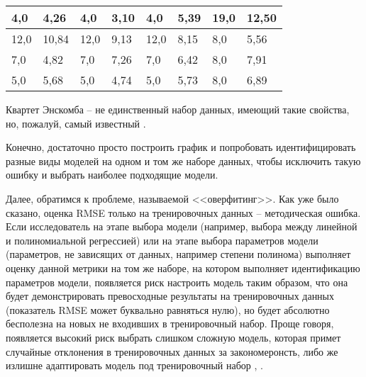 \begin{table}[!htp]
\begin{tabular}{|ll|ll|ll|ll|}
			\multicolumn{1}{|l|}{4,0}  & 4,26                   & \multicolumn{1}{l|}{4,0}  & 3,10                   & \multicolumn{1}{l|}{4,0}  & 5,39                   & \multicolumn{1}{l|}{19,0} & 12,50                  \\ \hline
			\multicolumn{1}{|l|}{12,0} & 10,84                  & \multicolumn{1}{l|}{12,0} & 9,13                   & \multicolumn{1}{l|}{12,0} & 8,15                   & \multicolumn{1}{l|}{8,0}  & 5,56                   \\ \hline
			\multicolumn{1}{|l|}{7,0}  & 4,82                   & \multicolumn{1}{l|}{7,0}  & 7,26                   & \multicolumn{1}{l|}{7,0}  & 6,42                   & \multicolumn{1}{l|}{8,0}  & 7,91                   \\ \hline
			\multicolumn{1}{|l|}{5,0}  & 5,68                   & \multicolumn{1}{l|}{5,0}  & 4,74                   & \multicolumn{1}{l|}{5,0}  & 5,73                   & \multicolumn{1}{l|}{8,0}  & 6,89                   \\ \hline
		\end{tabular}
		\label{table:anscombe_quartet}
	\end{table}

	Квартет Энскомба -- не единственный набор данных, имеющий такие свойства, 
	но, пожалуй, самый известный \cite{anscombe_quartet_wikipedia}. 

	Конечно, достаточно просто построить график и попробовать идентифицировать
	разные виды моделей на одном и том же наборе данных, чтобы исключить такую
	ошибку и выбрать наиболее подходящие модели.

	
	Далее, обратимся к проблеме, называемой <<оверфитинг>>. Как уже было 
	сказано, оценка RMSE только на тренировочных данных -- методическая ошибка. 
	Если исследователь на этапе выбора модели (например, выбора между линейной
	и полиномиальной регрессией) или на этапе выбора параметров модели 
	(параметров, не зависящих от данных, например степени полинома) выполняет
	оценку данной метрики на том же наборе, на котором выполняет идентификацию 
	параметров модели, появляется риск настроить модель таким образом, что она 
	будет демонстрировать превосходные результаты на тренировочных данных 
	(показатель RMSE может буквально равняться нулю), но будет абсолютно 
	бесполезна на новых не входивших в тренировочный набор. Проще говоря, 
	появляется высокий риск выбрать слишком сложную модель, которая примет 
	случайные отклонения в тренировочных данных за закономеронсть, либо же 
	излишне адаптировать модель под тренировочный набор	\cite{hands_on_ml}, 
	\cite{nikolenko_deep_learning}.

